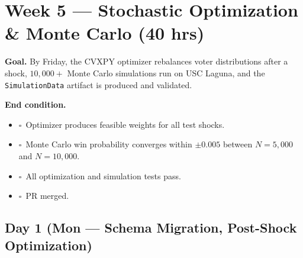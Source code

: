 \documentclass[11pt]{article}
\newcommand{\dayhead}[2]{%
  \subsection*{Day #1 \normalfont\small\color{codegray}(#2)}}
\newcommand{\done}{\textcolor{sectionblue}{$\square$}\ }
\begin{document}
\newpage

\section{Week 5 --- Stochastic Optimization \& Monte Carlo (40 hrs)}

\textbf{Goal.} By Friday, the CVXPY optimizer rebalances voter distributions
after a shock, $10{,}000+$ Monte Carlo simulations run on USC Laguna, and the
\texttt{SimulationData} artifact is produced and validated.

\textbf{End condition.}
\begin{itemize}[leftmargin=1.6em, itemsep=1pt]
  \item \done Optimizer produces feasible weights for all test shocks.
  \item \done Monte Carlo win probability converges within $\pm 0.005$
        between $N=5{,}000$ and $N=10{,}000$.
  \item \done All optimization and simulation tests pass.
  \item \done PR merged.
\end{itemize}

\dayhead{1}{Mon --- Schema Migration, Post-Shock Optimization}
\end{document}
